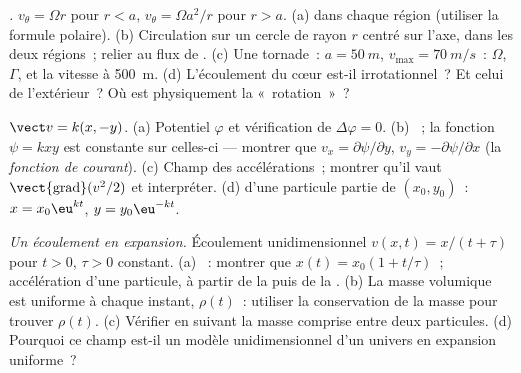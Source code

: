 \begin{exercise}[$\star\star$]\label{exo:b2:fluid-kinematics:8}
\emph{.} $v_\theta = \Omega r$ pour $r < a$, $v_\theta = \Omega a^2/r$
pour $r > a$. (a)  dans chaque région (utiliser la formule polaire). (b)
Circulation sur un cercle de rayon $r$ centré sur l'axe, dans les deux
régions~; relier au flux de . (c) Une tornade~: $a = \qty{50}{m}$,
$v_{\max} = \qty{70}{m/s}$~: $\Omega$, $\Gamma$, et la vitesse à \qty{500}{m}.
(d) L'écoulement du cœur est-il irrotationnel~? Et celui de l'extérieur~? Où est
physiquement la «~rotation~»~?
\end{exercise}

\begin{exercise}[$\star\star$]\label{exo:b2:fluid-kinematics:9}
\emph{} $\vect v = k(x, -y)$. (a) Potentiel $\varphi$ et
vérification de $\Delta\varphi = 0$. (b) ~; la fonction $\psi = kxy$ est
constante sur celles-ci --- montrer que $v_x = \partial\psi/\partial y$, $v_y = -\partial\psi/
\partial x$ (la \emph{fonction de courant}). (c) Champ des accélérations~; montrer qu'il
vaut $\operatorname{\vect{grad}}(v^2/2)$ et interpréter. (d)  d'une
particule partie de $(x_0, y_0)$~: $x = x_0\eu^{kt}$, $y = y_0\eu^{-kt}$.
\end{exercise}

\begin{exercise}[$\star\star\star$]\label{exo:b2:fluid-kinematics:10}
\emph{Un écoulement en expansion.} Écoulement unidimensionnel $v(x, t) = x/(t + \tau)$
pour $t > 0$, $\tau > 0$ constant. (a) ~: montrer que $x(t) = x_0(1 +
t/\tau)$~; accélération d'une particule, à partir de la  puis de
la . (b) La masse volumique est uniforme à chaque instant,
$\rho(t)$~: utiliser la conservation de la masse pour trouver $\rho(t)$. (c) Vérifier en
suivant la masse comprise entre deux particules. (d) Pourquoi ce champ est-il un
modèle unidimensionnel d'un univers en expansion uniforme~?
\end{exercise}

